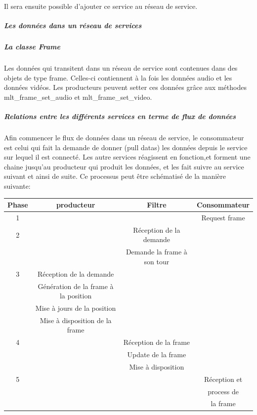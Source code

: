 Il sera ensuite possible d'ajouter ce service au réseau de service.

\subparagraph{Les données dans un réseau de services}

\subparagraph{La classe Frame}

\subparagraph{}

Les données qui transitent dans un réseau de service sont contenues dans
des objets de type frame. Celles-ci contiennent à la fois les données
audio et les données vidéos. Les producteurs peuvent setter ces données
grâce aux méthodes mlt\_frame\_set\_audio et mlt\_frame\_set\_video.

\subparagraph{Relations entre les différents services en terme de flux
de données}

Afin commencer le flux de données dans un réseau de service, le
consommateur est celui qui fait la demande de donner (pull datas) les
données depuis le service sur lequel il est connecté. Les autre services
réagissent en fonction,et forment une chaine jusqu'au producteur qui
produit les données, et les fait suivre au service suivant et ainsi de
suite. Ce processus peut être schématisé de la manière suivante:

\begin{center}

  \begin{tabular}{ | c | c | c | c |}

    \hline

Phase & producteur & Filtre & Consommateur    \\ \hline \hline

1 & & & Request frame   \\ \hline

2 & & Réception de la demande & \\

  & & Demande la frame à son tour & \\ \hline


3 & Réception de la demande & & \\

  & Génération de la frame à la position & & \\

  & Mise à jours de la position & & \\

  & Mise à disposition de la frame & & \\ \hline

4 & & Réception de la frame       & \\

  & & Update de la frame & \\

  & & Mise à disposition & \\ \hline

5 & & & Réception et    \\

  & & & process de      \\

  & & & la frame        \\ \hline

  \end{tabular}

\end{center}

